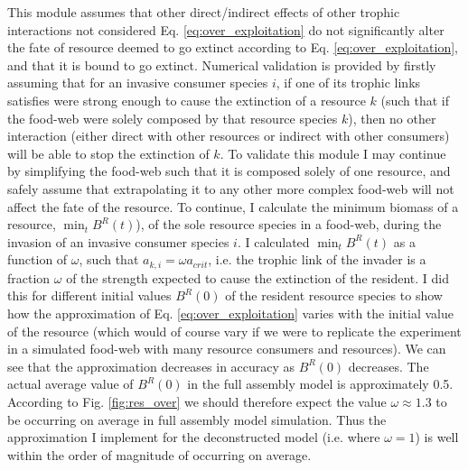 \documentclass[a4paper]{report}
\DeclareMathOperator{\min}{min}
\begin{document}
This module assumes that other direct/indirect effects 
of other trophic interactions not considered Eq. \eqref{eq:over_exploitation} do not significantly alter the fate of resource deemed to go extinct according to Eq. \eqref{eq:over_exploitation}, and that it is bound to go extinct. Numerical validation is provided by firstly assuming that for an invasive consumer species $i$, if one of its trophic links satisfies were strong enough to cause the extinction of a resource $k$ (such that if the food-web were solely composed by that resource species $k$), then no other interaction (either direct with other resources or indirect with other consumers) will be able to stop the extinction of $k$. To validate this module I may continue by simplifying the food-web such that it is composed solely of one resource, and safely assume that extrapolating it to any other more complex food-web will not affect the fate of the resource. To continue, I calculate the minimum biomass of a resource, $\min_{t} B^R(t)$), of the sole resource species in a food-web, during the invasion of an invasive consumer species $i$. I calculated $\min_{t} B^R(t)$ as a function of $\omega$, such that $a_{k,i}=\omega a_{crit}$, i.e. the trophic link of the invader is a fraction $\omega$ of the strength expected to cause the extinction of the resident. I did this for different initial values $B^R(0)$ of the resident resource species to show how the approximation of Eq. \eqref{eq:over_exploitation} varies with the initial value of the resource (which would of course vary if we were to replicate the experiment in a simulated food-web with many resource consumers and resources). We can see that the approximation decreases in accuracy as $B^R(0)$ decreases. The actual average value of $B^R(0)$ in the full assembly model is approximately 0.5. According to Fig. \ref{fig:res_over} we should therefore expect the value $\omega\approx 1.3$ to be occurring on average in full assembly model simulation. Thus the approximation I implement for the deconstructed model (i.e. where $\omega=1$) is well within the order of magnitude of occurring on average.
\end{document}
